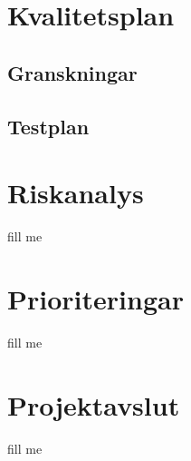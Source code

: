 \documentclass[projektplan/plan.tex]{subfiles}
\begin{document}
\section{Kvalitetsplan}
\subsection{Granskningar}
\subsection{Testplan}


\section{Riskanalys}
fill me

\section{Prioriteringar}
fill me

\section{Projektavslut}
fill me
\end{document}
